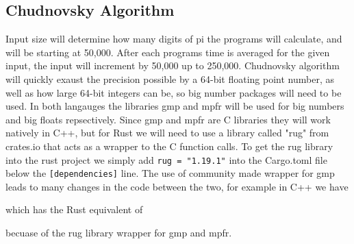 \documentclass[10pt]{IEEEtran}
\begin{document}
\subsection{Chudnovsky Algorithm}
Input size will determine how many digits of pi the programs will calculate, and will be starting at 50,000. 
After each programs time is averaged for the given input, the input will increment by 50,000 up to 250,000.
Chudnovsky algorithm will quickly exaust the precision possible by a 64-bit floating point number, as well as how large 64-bit integers can be, so big number packages will need to be used.
In both langauges the libraries gmp\cite{gmp} and mpfr\cite{mpfr} will be used for big numbers and big floats repsectively.
Since gmp and mpfr are C libraries they will work natively in C++, but for Rust we will need to use a library called "rug" from crates.io that acts as a wrapper to the C function calls\cite{rug}.
To get the rug library into the rust project we simply add \verb|rug = "1.19.1"| into the Cargo.toml file below the \verb|[dependencies]| line.
The use of community made wrapper for gmp leads to many changes in the code between the two, for example in C++ we have

which has the Rust equivalent of

becuase of the rug library wrapper for gmp and mpfr.
\nocite{*}


\end{document}
